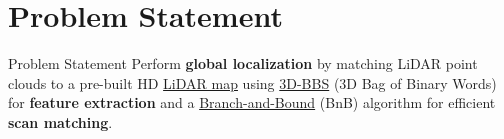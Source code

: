 \section{Problem Statement}

\begin{frame}{Problem Statement}
Perform \textbf{global localization} by matching LiDAR point clouds to a pre-built HD \underline{LiDAR map} using \underline{3D-BBS} (3D Bag of Binary Words) for \textbf{feature extraction} and a \underline{Branch-and-Bound} (BnB) algorithm for efficient \textbf{scan matching}.
\end{frame}

